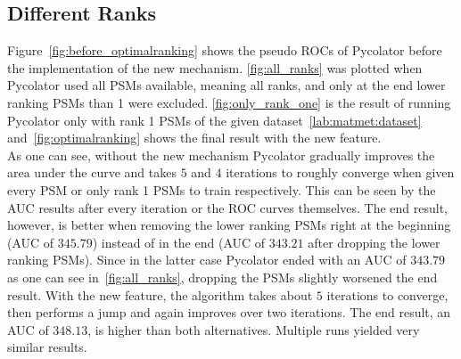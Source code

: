 \subsection{Different Ranks}
\label{lab:results:ranks}
Figure~\ref{fig:before_optimalranking} shows the pseudo ROCs of Pycolator before the implementation of the new mechanism. \ref{fig:all_ranks} was plotted when Pycolator used all PSMs available, meaning all ranks, and only at the end lower ranking PSMs than 1 were excluded. \ref{fig:only_rank_one} is the result of running Pycolator only with rank 1 PSMs of the given dataset~\ref{lab:matmet:dataset} and~\ref{fig:optimalranking} shows the final result with the new feature.\\
As one can see, without the new mechanism Pycolator gradually improves the area under the curve and takes $5$ and $4$ iterations to roughly converge when given every PSM or only rank 1 PSMs to train respectively. This can be seen by the AUC results after every iteration or the ROC curves themselves. The end result, however, is better when removing the lower ranking PSMs right at the beginning (AUC of $345.79$) instead of in the end (AUC of $343.21$ after dropping the lower ranking PSMs). Since in the latter case Pycolator ended with an AUC of $343.79$ as one can see in~\ref{fig:all_ranks}, dropping the PSMs slightly worsened the end result. With the new feature, the algorithm takes about $5$ iterations to converge, then performs a jump and again improves over two iterations. The end result, an AUC of $348.13$, is higher than both alternatives. Multiple runs yielded very similar results. 
\renewcommand{\baselinestretch}{0.9}
